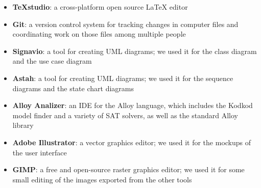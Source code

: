 \begin{itemize}
\item \textbf{TeXstudio}: a cross-platform open source LaTeX editor
\item \textbf{Git}: a version control system for tracking changes in computer files and coordinating work on those files among multiple people
\item \textbf{Signavio}: a tool for creating UML diagrams; we used it for the class diagram and the use case diagram
\item \textbf{Astah}: a tool for creating UML diagrams; we used it for the sequence diagrams and the state chart diagrams
\item \textbf{Alloy Analizer}: an IDE for the Alloy language, which includes the Kodkod model finder and a variety of SAT solvers, as well as the standard Alloy library
\item \textbf{Adobe Illustrator}: a vector graphics editor; we used it for the mockups of the user interface
\item \textbf{GIMP}: a free and open-source raster graphics editor; we used it for some small editing of the images exported from the other tools
\end{itemize}